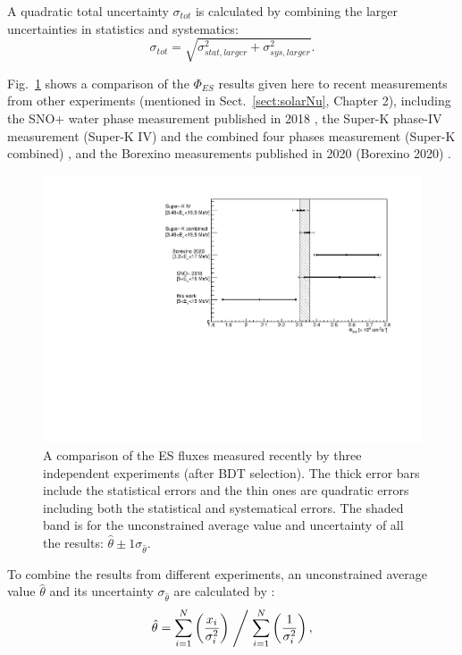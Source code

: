 A quadratic total uncertainty $\sigma_{tot}$ is calculated by combining the larger uncertainties in statistics and systematics:
\begin{equation}
\sigma_{tot}=\sqrt{\sigma^2_{stat,larger}+\sigma^2_{sys,larger}}.
\end{equation}

Fig.~\ref{fig:ESfluxCompare} shows a comparison of the $\Phi_{ES}$ results given here to recent measurements from other experiments (mentioned in Sect.~\ref{sect:solarNu}, Chapter 2), including the SNO+ water phase measurement published in 2018 \cite{anderson2019measurement}, the Super-K phase-IV measurement (Super-K IV) and the combined four phases measurement (Super-K combined) \cite{abe2016solar}, and the Borexino measurements published in 2020 (Borexino 2020) \cite{agostini2020improved}.

\begin{figure}[!htb]
	\centering
	\includegraphics[width=12cm]{ESfluxCompare.pdf}
	\caption[A comparison of the ES flux measured recently by three independent experiments (after BDT selection).]{A comparison of the ES fluxes measured recently by three independent experiments (after BDT selection). The thick error bars include the statistical errors and the thin ones are quadratic errors including both the statistical and systematical errors. The shaded band is for the unconstrained average value and uncertainty of all the results: $\hat \theta \pm 1\sigma_{\hat \theta}$.	\label{fig:ESfluxCompare}}
\end{figure}

To combine the results from different experiments, an unconstrained average value $\hat \theta$ and its uncertainty $\sigma_{\hat\theta}$ are calculated by \cite{pdg2020,behnke2013data}:
\begin{equation}
\hat \theta = \sum_{i=1}^{N} \left(\frac{x_i}{\sigma_i^2}\right)\Biggm/\sum_{i=1}^{N}\left(\frac{1}{\sigma_i^2}\right),
\end{equation}

